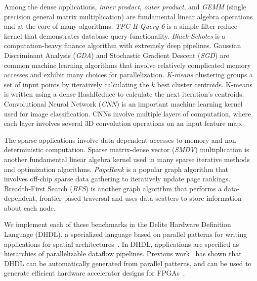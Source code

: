   Among the dense applications, \textit{inner product}, \textit{outer product}, and \textit{GEMM} (single precision general matrix multiplication) are fundamental linear algebra operations
  and at the core of many algorithms.
  \textit{TPC-H Query 6} is a simple filter-reduce kernel that demonstrates database query functionality.
  \textit{Black-Scholes} is a computation-heavy finance algorithm with extremely deep pipelines.
  Gaussian Discriminant Analysis (\textit{GDA}) and Stochastic Gradient Descent (\textit{SGD}) are common machine learning algorithms that involve relatively complicated memory accesses and exhibit many choices for parallelization.
  \textit{K-means} clustering groups a set of input points by iteratively calculating the $k$ best cluster centroids.
  K-means is written using a dense HashReduce to calculate the next iteration's centroids.
  Convolutional Neural Network (\textit{CNN}) is an important machine learning kernel used for image classification. CNNs involve multiple layers of computation, where each layer involves several 3D convolution operations on an input feature map.

  The sparse applications involve data-dependent accesses to memory and non-deterministic computation.
  Sparse matrix-dense vector (\textit{SMDV}) multiplication is another fundamental linear algebra kernel used in many sparse iterative methods and optimization algorithms.
  \textit{PageRank} is a popular graph algorithm that involves off-chip sparse data gathering to iteratively update page rankings.
  Breadth-First Search (\textit{BFS}) is another graph algorithm that performs a data-dependent, frontier-based traversal and uses data scatters to store information about each node.





We implement each of these benchmarks in the Delite Hardware Definition Language (DHDL), 
a specialized language based on parallel patterns for writing applications for spatial architectures~\cite{dhdl}. In DHDL, applications are specified as hierarchies of parallelizable dataflow pipelines. Previous work~\cite{delite2maxj} has shown that DHDL can be automatically generated
from parallel patterns, and can be used to generate efficient hardware accelerator designs for FPGAs~\cite{dhdl}.



